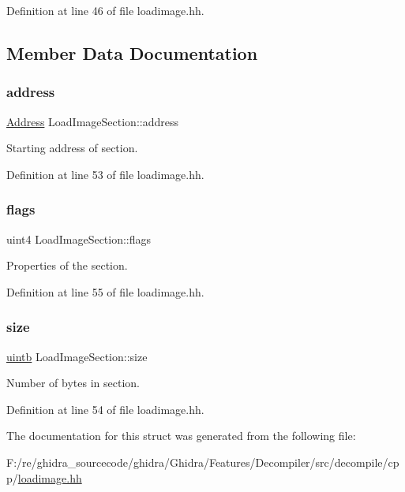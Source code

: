 Definition at line 46 of file loadimage.\+hh.



\subsection{Member Data Documentation}
\mbox{\label{struct_load_image_section_aacf49d79a9230343f798357f9731f613}} 
\subsubsection{\texorpdfstring{address}{address}}
{\footnotesize\ttfamily \mbox{\hyperlink{class_address}{Address}} Load\+Image\+Section\+::address}



Starting address of section. 



Definition at line 53 of file loadimage.\+hh.

\mbox{\label{struct_load_image_section_a3cbd878bd8ba2890c81ef5b236633374}} 
\subsubsection{\texorpdfstring{flags}{flags}}
{\footnotesize\ttfamily uint4 Load\+Image\+Section\+::flags}



Properties of the section. 



Definition at line 55 of file loadimage.\+hh.

\mbox{\label{struct_load_image_section_ad11c97bab282432299846b93f28c135b}} 
\subsubsection{\texorpdfstring{size}{size}}
{\footnotesize\ttfamily \mbox{\hyperlink{types_8h_a2db313c5d32a12b01d26ac9b3bca178f}{uintb}} Load\+Image\+Section\+::size}



Number of bytes in section. 



Definition at line 54 of file loadimage.\+hh.



The documentation for this struct was generated from the following file\+:\begin{DoxyCompactItemize}
\item 
F\+:/re/ghidra\+\_\+sourcecode/ghidra/\+Ghidra/\+Features/\+Decompiler/src/decompile/cpp/\mbox{\hyperlink{loadimage_8hh}{loadimage.\+hh}}\end{DoxyCompactItemize}
